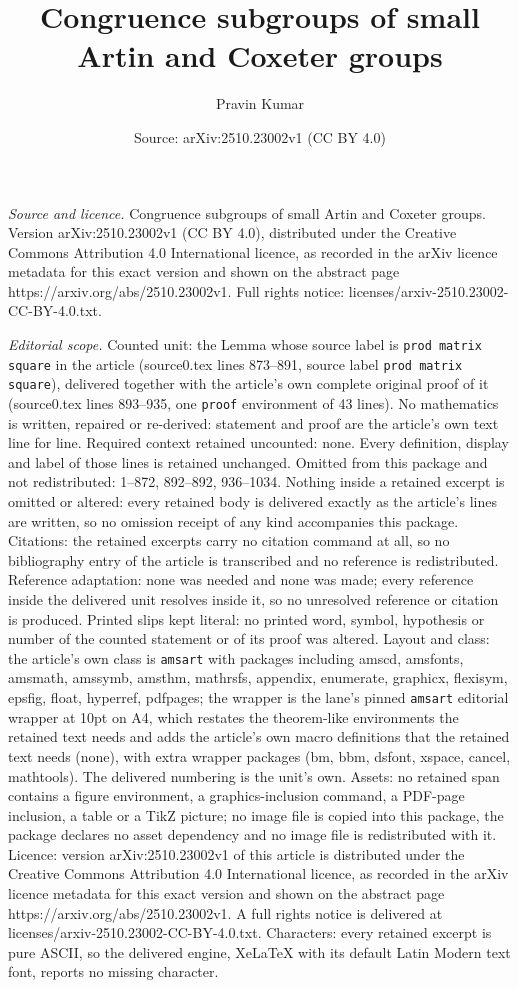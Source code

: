 \documentclass[10pt,a4paper]{amsart}
\title[Congruence subgroups of small Artin and Coxeter groups]{Congruence subgroups of small Artin and Coxeter groups}
\author{Pravin Kumar}
\date{Source: arXiv:2510.23002v1 (CC BY 4.0)}
\begin{document}
\maketitle

\noindent\emph{Source and licence.} Congruence subgroups of small Artin and Coxeter groups. Version arXiv:2510.23002v1 (CC BY 4.0), distributed under the Creative Commons Attribution 4.0 International licence, as recorded in the arXiv licence metadata for this exact version and shown on the abstract page https://arxiv.org/abs/2510.23002v1. Full rights notice: licenses/arxiv-2510.23002-CC-BY-4.0.txt.\par\smallskip

\noindent\textit{Editorial scope.} Counted unit: the Lemma whose source label is \texttt{prod matrix square} in the article (source0.tex lines 873--891, source label \texttt{prod matrix square}), delivered together with the article's own complete original proof of it (source0.tex lines 893--935, one \texttt{proof} environment of 43 lines). No mathematics is written, repaired or re-derived: statement and proof are the article's own text line for line. Required context retained uncounted: none. Every definition, display and label of those lines is retained unchanged. Omitted from this package and not redistributed: 1--872, 892--892, 936--1034. Nothing inside a retained excerpt is omitted or altered: every retained body is delivered exactly as the article's lines are written, so no omission receipt of any kind accompanies this package. Citations: the retained excerpts carry no citation command at all, so no bibliography entry of the article is transcribed and no reference is redistributed. Reference adaptation: none was needed and none was made; every reference inside the delivered unit resolves inside it, so no unresolved reference or citation is produced. Printed slips kept literal: no printed word, symbol, hypothesis or number of the counted statement or of its proof was altered. Layout and class: the article's own class is \texttt{amsart} with packages including amscd, amsfonts, amsmath, amssymb, amsthm, mathrsfs, appendix, enumerate, graphicx, flexisym, epsfig, float, hyperref, pdfpages; the wrapper is the lane's pinned \texttt{amsart} editorial wrapper at 10pt on A4, which restates the theorem-like environments the retained text needs and adds the article's own macro definitions that the retained text needs (none), with extra wrapper packages (bm, bbm, dsfont, xspace, cancel, mathtools). The delivered numbering is the unit's own. Assets: no retained span contains a figure environment, a graphics-inclusion command, a PDF-page inclusion, a table or a TikZ picture; no image file is copied into this package, the package declares no asset dependency and no image file is redistributed with it. Licence: version arXiv:2510.23002v1 of this article is distributed under the Creative Commons Attribution 4.0 International licence, as recorded in the arXiv licence metadata for this exact version and shown on the abstract page https://arxiv.org/abs/2510.23002v1. A full rights notice is delivered at licenses/arxiv-2510.23002-CC-BY-4.0.txt. Characters: every retained excerpt is pure ASCII, so the delivered engine, XeLaTeX with its default Latin Modern text font, reports no missing character.
\end{document}

